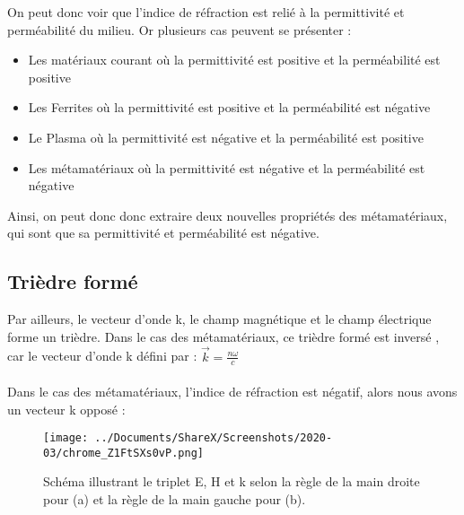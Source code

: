 \documentclass[12pt,a4paper]{article}
\begin{document}
On peut donc voir que l'indice de réfraction est relié à la permittivité et perméabilité du milieu. Or plusieurs cas peuvent se présenter : \\
\begin{itemize}
\item Les matériaux courant où la permittivité est positive et la perméabilité est positive
\item Les Ferrites où la permittivité est positive et la perméabilité est négative
\item Le Plasma où la permittivité est négative et la perméabilité est positive
\item Les métamatériaux où la permittivité est négative et la perméabilité est négative
\end{itemize} 
	Ainsi, on peut donc donc extraire deux nouvelles propriétés des métamatériaux, qui sont que sa permittivité et perméabilité est négative.\cite{Fan2017}
	\subsection{Trièdre formé}
	Par ailleurs, le vecteur d’onde k, le champ magnétique et le champ électrique forme un trièdre. Dans le cas des métamatériaux, ce trièdre formé est inversé , car le vecteur d’onde k défini par : \hspace{4cm} \large \textbf{$\overrightarrow{k}=\frac{n\omega}{c}$}\normalsize \\ \\
	Dans le cas des métamatériaux, l’indice de réfraction est négatif, alors nous avons un vecteur k opposé :\cite{DeLustrac} \\
\begin{wrapfigure}{l}{1\textwidth}
	\centering
	\texttt{[image: ../Documents/ShareX/Screenshots/2020-03/chrome\_Z1FtSXs0vP.png]}
	\caption{Schéma illustrant le triplet E, H et k selon la règle de la main droite pour (a) et la règle de la main gauche pour (b).}
\end{wrapfigure}\\ \\ \\ \\ \\ \\ \\ \\ \\ \\ \\ \\ \\ \\
\end{document}
